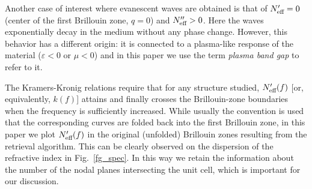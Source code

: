 \documentclass[letterpaper,12pt]{report}
\begin{document}
Another case of interest where evanescent waves are obtained is that of $N_{\text{eff} }' = 0$
(center of the first Brillouin zone, $q=0$) and $N_{\text{eff} }''>0$. Here the waves exponentially
decay in the medium without any phase change. However, this behavior has a different
origin: it is connected to a plasma-like response of the material ($\varepsilon<0$ or
$\mu<0$) and in this paper we use the term \textit{plasma band gap} to refer to it.

The Kramers-Kronig relations require that for any structure studied, $N_{\text{eff} }'(f)$ [or,
equivalently, $k(f)$] attains and finally crosses the Brillouin-zone boundaries when the
frequency is sufficiently increased. While usually the convention is used that the
corresponding curves are folded back into the first Brillouin zone, in this paper we plot
$N_{\text{eff} }'(f)$ in the original (unfolded) Brillouin zones resulting from the retrieval
algorithm. This can be clearly observed on the dispersion of the refractive index in
Fig.\ \ref{fg_spec}. In this way we retain the information about the number of the nodal
planes intersecting the unit cell, which is important for our discussion.
\end{document}
